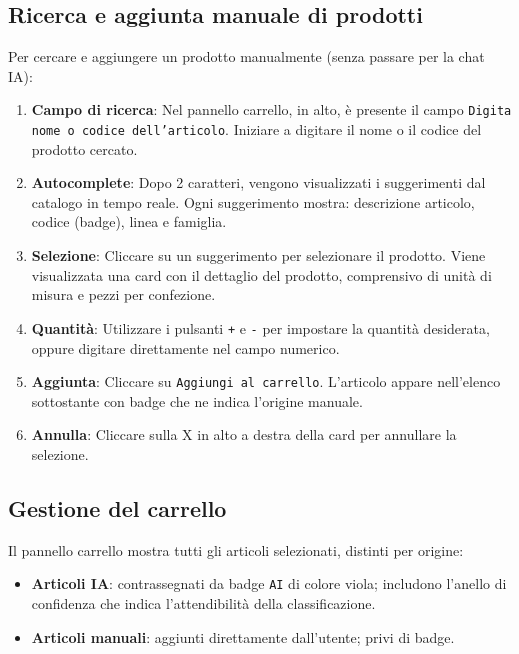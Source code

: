 \subsection{Ricerca e aggiunta manuale di prodotti}

Per cercare e aggiungere un prodotto manualmente (senza passare per la chat IA):

\begin{enumerate}
    \item \textbf{Campo di ricerca}: Nel pannello carrello, in alto, \`e presente il campo \texttt{Digita nome o codice dell'articolo}. Iniziare a digitare il nome o il codice del prodotto cercato.
    \item \textbf{Autocomplete}: Dopo 2 caratteri, vengono visualizzati i suggerimenti dal catalogo in tempo reale. Ogni suggerimento mostra: descrizione articolo, codice (badge), linea e famiglia.
    \item \textbf{Selezione}: Cliccare su un suggerimento per selezionare il prodotto. Viene visualizzata una card con il dettaglio del prodotto, comprensivo di unit\`a di misura e pezzi per confezione.
    \item \textbf{Quantit\`a}: Utilizzare i pulsanti \texttt{+} e \texttt{-} per impostare la quantit\`a desiderata, oppure digitare direttamente nel campo numerico.
    \item \textbf{Aggiunta}: Cliccare su \texttt{Aggiungi al carrello}. L'articolo appare nell'elenco sottostante con badge che ne indica l'origine manuale.
    \item \textbf{Annulla}: Cliccare sulla X in alto a destra della card per annullare la selezione.
\end{enumerate}

\subsection{Gestione del carrello}

Il pannello carrello mostra tutti gli articoli selezionati, distinti per origine:

\begin{itemize}
    \item \textbf{Articoli IA}: contrassegnati da badge \texttt{AI} di colore viola; includono l'anello di confidenza che indica l'attendibilit\`a della classificazione.
    \item \textbf{Articoli manuali}: aggiunti direttamente dall'utente; privi di badge.
\end{itemize}

